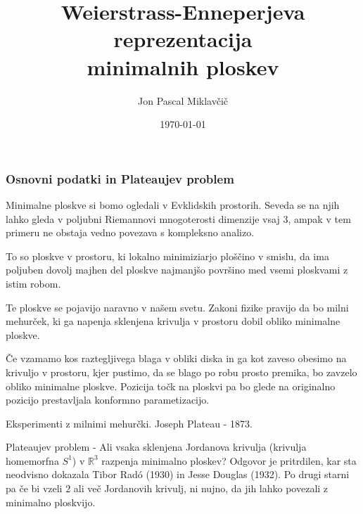 \documentclass[8pt]{beamer}
\title[Weierstrass-Enneperjeva parametrizacija]{Weierstrass-Enneperjeva reprezentacija\\minimalnih ploskev}
\subtitle{}
\author[Jon Pascal Miklavčič]{Jon Pascal Miklavčič}
\institute[]{Mentor: doc.~dr.~Uroš Kuzman}
\date{\tiny \today}
\theoremstyle{definition}
\theoremstyle{remark}
\theoremstyle{plain}
\numberwithin{equation}{section}  %
\begin{document}
\frame{\titlepage}

\begin{frame}
    \frametitle{Osnovni podatki in Plateaujev problem}

    Minimalne ploskve si bomo ogledali v Evklidskih prostorih. Seveda se na njih lahko gleda v poljubni Riemannovi mnogoterosti dimenzije vsaj $3$, ampak v tem primeru ne obstaja vedno povezava s kompleksno analizo. 

    \vspace{0.8em}

    To so ploskve v prostoru, ki \textcolor{red1}{lokalno minimiziarjo ploščino} v smislu, da ima poljuben dovolj majhen del ploskve najmanjšo površino med vsemi ploskvami z istim robom.

    \vspace{0.8em}

    Te ploskve se pojavijo naravno v našem svetu. Zakoni fizike pravijo da bo milni mehurček, ki ga napenja sklenjena krivulja v prostoru dobil obliko minimalne ploskve. 

    \vspace{0.8em}
    
    Če vzamamo kos raztegljivega blaga v obliki diska in ga kot zaveso obesimo na krivuljo v prostoru, kjer pustimo, da se blago po robu prosto premika, bo zavzelo obliko minimalne ploskve. Pozicija točk na ploskvi pa bo glede na originalno pozicijo prestavljala \textcolor{red1}{konformno parametizacijo}.

    \vspace{0.8em}

    Eksperimenti z milnimi mehurčki. \textcolor{red1}{Joseph Plateau} - 1873. 

    \vspace{0.8em}

    \textcolor{red1}{Plateaujev problem} - Ali vsaka sklenjena Jordanova krivulja (krivulja homemorfna $S^1$) v $\mathbb{R}^3$ razpenja minimalno ploskev? Odgovor je pritrdilen, kar sta neodvisno dokazala Tibor Radó (1930) in Jesse Douglas (1932). Po drugi starni pa če bi vzeli $2$ ali več Jordanovih krivulj, ni nujno, da jih lahko povezali z minimalno ploskvijo. 
    
\end{frame}
\end{document}
